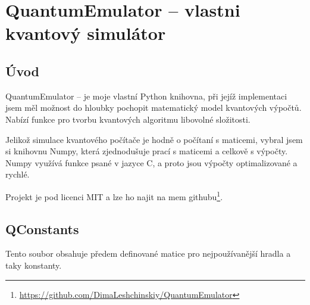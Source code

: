 \documentclass[11pt]{article}
\begin{document}
\newpage

\section{QuantumEmulator – vlastni kvantový simulátor}
\label{sec:QuantumEmulator}
\subsection{Úvod}
QuantumEmulator – je moje vlastní Python knihovna, při jejíž implementaci jsem měl možnost do hloubky pochopit matematický model kvantových výpočtů.
Nabízí funkce pro tvorbu kvantových algoritmu libovolné složitosti.
\par Jelikož simulace kvantového počítače je hodně o počítaní s maticemi, vybral jsem si knihovnu Numpy, která zjednodušuje prací s maticemi a celkově s výpočty.
Numpy využívá funkce psané v jazyce C, a proto jsou výpočty optimalizované a rychlé.
\par Projekt je pod licenci MIT a lze ho najit na mem githubu\footnote{\url{https://github.com/DimaLeshchinskiy/QuantumEmulator}}.

\subsection{QConstants}
Tento soubor obsahuje předem definované matice pro nejpoužívanější hradla a taky konstanty.
\end{document}
